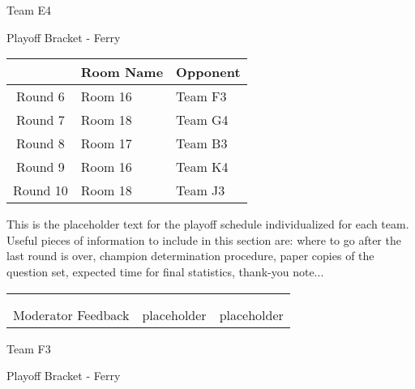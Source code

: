 \documentclass{article}%
\begin{document}
\newpage%
\begin{center}%
\begin{Huge}%
Team E4%
\end{Huge}%
\vspace*{12pt}%
\linebreak%
\begin{Large}%
Playoff Bracket {-} Ferry%
\end{Large}%
\end{center}%
\vspace*{4pt}%
%
\begin{tabularx}{\textwidth}{|c|Y|Y|}%
\hline%
&Room Name&Opponent\\%
\hline%
Round 6&Room 16&Team F3\\%
Round 7&Room 18&Team G4\\%
Round 8&Room 17&Team B3\\%
Round 9&Room 16&Team K4\\%
Round 10&Room 18&Team J3\\%
\hline%
\end{tabularx}%
\vspace*{30pt}%
\linebreak%
This is the placeholder text for the playoff schedule individualized for each team. Useful pieces of information to include in this section are: where to go after the last round is over, champion determination procedure, paper copies of the question set, expected time for final statistics, thank{-}you note...%
\vspace*{30pt}%
\newline%
%
\begin{tabularx}{\textwidth}{YYY}%
  &  &  \\%
\\%
Moderator Feedback&placeholder&placeholder\\%
\end{tabularx}%
\newpage%
\begin{center}%
\begin{Huge}%
Team F3%
\end{Huge}%
\vspace*{12pt}%
\linebreak%
\begin{Large}%
Playoff Bracket {-} Ferry%
\end{Large}%
\end{center}%
\end{document}
